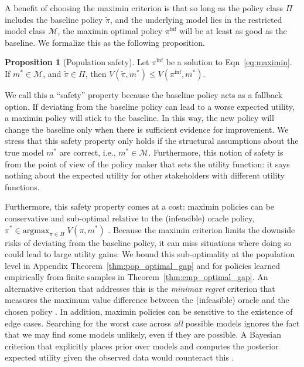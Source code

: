 \documentclass[12pt]{article}
\theoremstyle{definition}
\newtheorem{proposition}{Proposition}
\newcommand{\argmax}{\text{argmax}}
\newcommand{\<}{\langle}
\renewcommand{\>}{\rangle}
\newcommand\mcal[1]{\ensuremath{\mathcal{#1}}}
\begin{document}
A benefit of choosing the maximin criterion is that so long as the
policy class $\Pi$ includes the baseline policy $\tilde{\pi}$, and the
underlying model lies in the restricted model class $\mcal{M}$, the
maximin optimal policy $\pi^{\inf}$ will be at least as good as the
baseline.  We formalize this as the following proposition.
\begin{proposition}[Population safety]
  \label{prop:pop_safety} \singlespacing Let $\pi^{\inf}$ be a
  solution to Eqn~\eqref{eq:maximin}. If $m^\ast \in \mcal{M}$,
  and $\tilde{\pi} \in \Pi$, then
  $V(\tilde{\pi}, m^\ast)\leq V(\pi^{\inf}, m^\ast) $.
\end{proposition}

We call this a ``safety'' property because the baseline policy acts
as a fallback option. If deviating from the baseline policy can lead
to a worse expected utility, a maximin policy will stick to the
baseline. In this way, the new policy will change the baseline only
when there is sufficient evidence for improvement.  We stress
that this safety property only holds if the structural assumptions
about the true model $m^\ast$ are correct, i.e., $m^\ast \in \mathcal{M}$.
Furthermore, this notion of safety is from the point of view of the
policy maker that sets the utility function: it says nothing
about the expected utility for other stakeholders with
different utility functions.

Furthermore, this safety property comes at a cost: maximin policies can be
conservative and sub-optimal relative to the (infeasible) oracle
policy, $\pi^\ast \in \argmax_{\pi \in \Pi} \; V(\pi, m^\ast)$
\cite[e.g.,][]{Manski2005_partial,Cui2021_partial}.
Because the maximin criterion limits the downside risks of deviating
from the baseline policy, it can miss situations where doing so could
lead to large utility gains.  We bound this sub-optimality at the
population level in Appendix Theorem~\ref{thm:pop_optimal_gap} and for
policies learned empirically from finite samples in
Theorem~\ref{thm:emp_optimal_gap}.
An alternative criterion that addresses
this is the \emph{minimax regret} criterion that measures the maximum
value difference between the (infeasible) oracle and the chosen policy
\citep[e.g.,][]{Manski2007,Stoye2012,Song2014_point_decision}.
In addition, maximin policies can be sensitive to the existence of
edge cases. Searching for the worst case across \emph{all} possible
models ignores the fact that we may find some models unlikely, even if
they are possible.  A Bayesian criterion that explicitly places prior
over models and computes the posterior expected utility given the
observed data would counteract this \citep{jia2023bayesian}.
\end{document}
